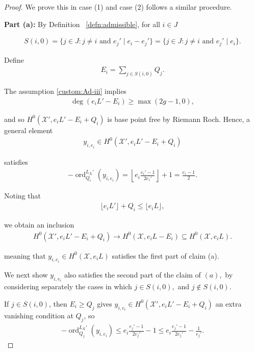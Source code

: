 \documentclass{amsart}
\theoremstyle{plain}
\theoremstyle{definition}
\theoremstyle{remark}
\numberwithin{equation}{section}
\DeclareMathOperator{\ord}{ord}
\newcommand\sx{\mathscr X}
\newcommand \subhalf[1]{\frac{{#1} - 1}{2{#1}}}
\newcommand{\halfcan}{L}
\begin{document}
\begin{proof}
We prove this in case (1) and case (2) follows a similar procedure.

{\bf Part (a):} 
By Definition ~\ref{defn:admissible}, for all $i\in J$

\begin{align*}
	S(i,0) = \{j \in J : j \neq i \text{ and }e_j' \mid e_i-e_j'\} = \{j \in J : j \neq i \text{ and }e_j' \mid e_i\}.
\end{align*}

\noindent
Define
\begin{align*}
	E_i = \sum_{j \in S(i,0)}^{}Q_j.
\end{align*}

\noindent
The assumption \ref{custom:Ad-iii} implies
\begin{align*}
	\deg \left( e_i L' - E_i \right) \geq \max(2g - 1,0),
\end{align*}

\noindent
and so $H^0(\sx', e_iL'-E_i + Q_i)$ is base point free by 
Riemann Roch.
Hence, a general element
\begin{align*}
	y_{i, e_i} \in H^0(\sx', e_iL'-E_i + Q_i)
\end{align*}

\noindent
satisfies
\begin{align*}
	-\ord_{Q_i}
^{\halfcan_X'}(y_{i, e_i}) = \left\lfloor e_i \subhalf {e_i'} \right\rfloor + 1 =
	\frac{e_i - 1}{2}.
\end{align*}


Noting that
\begin{align*}
	\lfloor e_i L' \rfloor + Q_i \leq \lfloor e_i L \rfloor,
\end{align*}

\noindent
we obtain an inclusion
\begin{align*}
	H^0(\sx', e_iL'-E_i + Q_i) \rightarrow H^0(\sx, e_iL - E_i) \subseteq 
H^0(\sx, e_iL).
\end{align*}

\noindent
meaning that $y_{i,e_i}\in H^0(\sx,e_iL)$ satisfies the first part of claim (a).


We next show $y_{i, e_i}$ also satisfies the second part of the
claim of $(a),$ by considering separately the cases in which $j
\in S(i, 0),$ and $j \notin S(i,0)$.

If $j \in S(i,0)$, then $E_i \geq Q_j$ gives $y_{i, e_i} \in H^0
(\sx', e_iL'-E_i + Q_i)$ an extra vanishing condition at $Q_j$, so
\begin{align*}
	-\ord_{Q_j}
^{\halfcan_X'}(y_{i, e_i}) \leq e_i\subhalf {e_j'} - 1 \leq e_i 
	\subhalf{e_j'} - \frac{1}{e_j'}.
\end{align*}


\end{proof}
\end{document}
